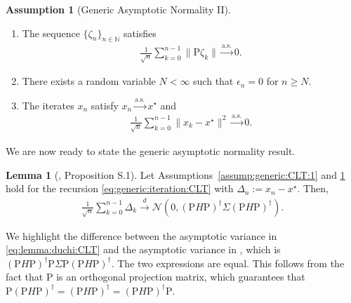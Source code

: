 \documentclass[11pt,a4paper]{article}
\theoremstyle{definition}
\newtheorem{assumption}[theorem]{Assumption}
\newtheorem{lemma}[theorem]{Lemma}
\begin{document}
\begin{assumption}[Generic Asymptotic Normality II]~
\label{assump:generic:CLT:2}
\begin{enumerate}[label=(\roman*)]
    \item \label{assump:generic:CLT:2:1} The sequence $\{\zeta_n\}_{n \in \mathbb N}$ satisfies 
    \begin{align*}
        \frac{1}{\sqrt{n}} \sum_{k=0}^{n-1} \| \text{P} \zeta_k\| \overset{\text{a.s.}}{\to} 0.
    \end{align*}
    
    \item \label{assump:generic:CLT:2:2} There exists a random variable $N < \infty$ such that $\epsilon_n = 0$ for $n \geq N$.

    \item \label{assump:generic:CLT:2:3} The iterates $x_n$ satisfy $x_n \overset{\text{a.s.}}{\to} x^\star$ and
    \begin{align*}
        \frac{1}{\sqrt{n}} \sum_{k=0}^{n-1} \| x_k - x^\star \|^2 \overset{\text{a.s.}}{\to} 0.
    \end{align*}
\end{enumerate}
\end{assumption}

We are now ready to state the generic asymptotic normality result.

\begin{lemma}[\citet{duchi2021asymptotic}, Proposition S.1]
\label{lemma:duchi:CLT}
Let Assumptions~\ref{assump:generic:CLT:1} and \ref{assump:generic:CLT:2} hold for the recursion \eqref{eq:generic:iteration:CLT} with $\Delta_n := x_n -x^\star$. Then,
\begin{align}
\label{eq:lemma:duchi:CLT}
    \frac{1}{\sqrt{n}} \sum_{k=0}^{n-1} \Delta_k \overset{d}{\to} \mathcal N(0, (\text{P} H \text{P})^\dagger \Sigma (\text{P} H \text{P})^\dagger).
\end{align}
\end{lemma}

We highlight the difference between the asymptotic variance in \eqref{eq:lemma:duchi:CLT} and the asymptotic variance in \cite[Proposition S.1 in Supplementary material]{duchi2021asymptotic}, which is $(\text{P} H \text{P})^\dagger \text{P} \Sigma \text{P} (\text{P} H \text{P})^\dagger$. The two expressions are equal. This follows from the fact that $\text{P}$ is an orthogonal projection matrix, which guarantees that $\text{P} (\text{P} H \text{P})^\dagger = (\text{P} H \text{P})^\dagger = (\text{P} H \text{P})^\dagger \text{P}$.
\end{document}
